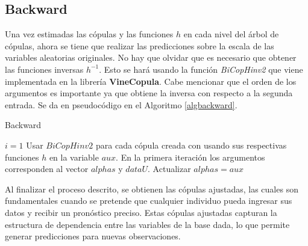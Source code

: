 \subsection{Backward}

Una vez estimadas las cópulas y las funciones $h$  en cada nivel del árbol de cópulas, ahora se tiene que realizar las predicciones sobre la escala de las variables aleatorias originales. No hay que olvidar que es necesario que obtener las funciones inversas $h^{-1}$. Esto se hará usando la función \textit{BiCopHinv2} que viene implementada en la librería \textbf{VineCopula}. Cabe mencionar que el orden de los argumentos es importante ya que obtiene la inversa con respecto a la segunda entrada. Se da en pseudocódigo en el Algoritmo \ref{algbackward}.


\begin{algorithm}[H]
      \caption{Backward}
      \label{algbackward}
      \begin{algorithmic}[1]  
        
        \State $i = 1$
          \State Usar $BiCopHinv2$ para cada cópula creada con usando sus respectivas funciones $h$ en la variable $aux$. En la primera iteración los argumentos corresponden al vector $alphas$ y $dataU$.
          \State Actualizar $alphas = aux$
        \EndWhile
       
      \end{algorithmic}
    \end{algorithm}

Al finalizar el proceso descrito, se obtienen las cópulas ajustadas, las cuales son fundamentales cuando se pretende que cualquier individuo pueda ingresar sus datos y recibir un pronóstico preciso. Estas cópulas ajustadas capturan la estructura de dependencia entre las variables de la base dada, lo que permite generar predicciones para nuevas observaciones. 